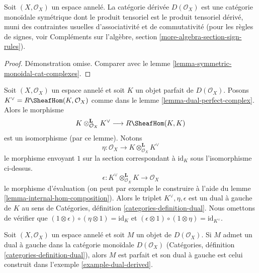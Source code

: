 \begin{lemma}

\label{lemma-symmetric-monoidal-derived}

Soit $(X, \mathcal{O}_X)$ un espace annelé. La catégorie dérivée
$D(\mathcal{O}_X)$ est une catégorie monoïdale symétrique dont le produit tensoriel est le produit tensoriel dérivé, muni des contraintes usuelles d'associativité et de commutativité (pour les règles de signes, voir Compléments sur l'algèbre, section \ref{more-algebra-section-sign-rules}).

\end{lemma}

\begin{proof}
Démonstration omise. Comparer avec le lemme \ref{lemma-symmetric-monoidal-cat-complexes}.
\end{proof}

\begin{example}

\label{example-dual-derived}

Soit $(X, \mathcal{O}_X)$ un espace annelé et soit $K$ un objet parfait de $D(\mathcal{O}_X)$. Posons $K^\vee = R\SheafHom(K, \mathcal{O}_X)$
comme dans le lemme \ref{lemma-dual-perfect-complex}. Alors le morphisme
$$
K \otimes_{\mathcal{O}_X}^\mathbf{L} K^\vee \longrightarrow R\SheafHom(K, K)
$$
est un isomorphisme (par ce lemme). Notons
$$
\eta :
\mathcal{O}_X
\longrightarrow
K \otimes_{\mathcal{O}_X}^\mathbf{L} K^\vee
$$
le morphisme envoyant $1$ sur la section correspondant à
$\text{id}_K$ sous l'isomorphisme ci-dessus.
$$
\epsilon : 
K^\vee
\otimes_{\mathcal{O}_X}^\mathbf{L} K
\longrightarrow
\mathcal{O}_X
$$
le morphisme d'évaluation (on peut par exemple le construire à l'aide du lemme \ref{lemma-internal-hom-composition}). Alors
le triplet $K^\vee, \eta, \epsilon$ est un dual à gauche de $K$ au sens de Catégories, définition \ref{categories-definition-dual}. Nous omettons de vérifier que
$(1 \otimes \epsilon) \circ (\eta \otimes 1) = \text{id}_K$
et
$(\epsilon \otimes 1) \circ (1 \otimes \eta) =
\text{id}_{K^\vee}$.

\end{example}

\begin{lemma}

\label{lemma-left-dual-derived}
Soit $(X, \mathcal{O}_X)$ un espace annelé et soit $M$ un objet de $D(\mathcal{O}_X)$. Si $M$ admet un dual à gauche dans la catégorie monoïdale $D(\mathcal{O}_X)$ (Catégories, définition \ref{categories-definition-dual}), alors $M$ est parfait et son dual à gauche est celui construit dans l'exemple \ref{example-dual-derived}.
\end{lemma}

